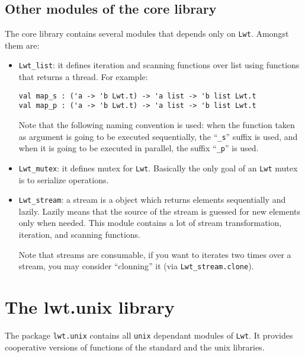 \documentclass{article}
\newcommand{\lwt}{\texttt{Lwt}\xspace}
\begin{document}
\subsection{Other modules of the core library}

The core library contains several modules that depends only on
\lwt. Amongst them are:

\begin{itemize}
\item \texttt{Lwt\_list}: it defines iteration and scanning functions
  over list using functions that returns a thread. For example:

\begin{verbatim}
val map_s : ('a -> 'b Lwt.t) -> 'a list -> 'b list Lwt.t
val map_p : ('a -> 'b Lwt.t) -> 'a list -> 'b list Lwt.t
\end{verbatim}

  Note that the following naming convention is used: when the function
  taken as argument is going to be executed sequentially, the
  ``\texttt{\_s}'' suffix is used, and when it is going to be executed
  in parallel, the suffix ``\texttt{\_p}'' is used.

\item \texttt{Lwt\_mutex}: it defines mutex for \lwt. Basically the
  only goal of an \lwt mutex is to serialize operations.

\item \texttt{Lwt\_stream}: a stream is a object which returns
  elements sequentially and lazily. Lazily means that the source of
  the stream is guessed for new elements only when needed. This module
  contains a lot of stream transformation, iteration, and scanning
  functions.

  Note that streams are consumable, if you want to iterates two times
  over a stream, you may consider ``clonning'' it (via
  \texttt{Lwt\_stream.clone}).
\end{itemize}

\section{The lwt.unix library}
\label{lwt.unix}

The package \texttt{lwt.unix} contains all \texttt{unix} dependant
modules of \lwt. It provides cooperative versions of functions of the
standard and the unix libraries.
\end{document}
